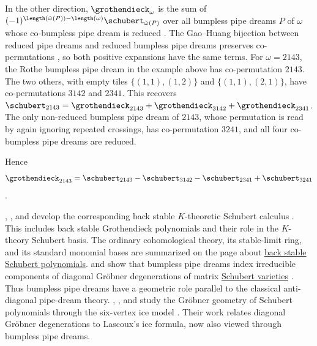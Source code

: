 In the other direction, $\grothendieck_\omega$ is the sum of
$(-1)^{\length(\check{\omega}(P)) - \length(\omega)}
\schubert_{\check{\omega}(P)}$ over all bumpless pipe dreams $P$ of $\omega$
whose co-bumpless pipe dream is reduced \cite[Thm.~1.1]{Weigandt2025x}.
The Gao--Huang bijection between reduced pipe dreams and reduced bumpless pipe
dreams \cite{GaoHuang2023PipeDreams} preserves co-permutations
\cite[Thm.~1.9]{Weigandt2025x}, so both
positive expansions have the same terms.
For $\omega = 2143$, the Rothe bumpless pipe dream in the example above has
co-permutation $2143$.  The two others, with empty tiles $\{(1,1),(1,2)\}$ and
$\{(1,1),(2,1)\}$, have co-permutations $3142$ and $2341$.  This recovers
$\schubert_{2143} = \grothendieck_{2143} + \grothendieck_{3142} + \grothendieck_{2341}$.
The only non-reduced bumpless pipe dream of $2143$, whose permutation is read
by again ignoring repeated crossings, has co-permutation $3241$,
and all four co-bumpless pipe dreams are reduced.

  Hence
\[
  \grothendieck_{2143} = \schubert_{2143} - \schubert_{3142}
  - \schubert_{2341} + \schubert_{3241}
\]
\cite[Ex.~1.4]{Weigandt2025x}.

, , and  develop
the corresponding back stable $K$-theoretic Schubert calculus
\cite{LamLeeShimozono2022}.  This includes back stable Grothendieck
polynomials and their role in the $K$-theory Schubert basis.
The ordinary cohomological theory, its stable-limit ring, and its standard
monomial bases are summarized on the page about
\hyperref[backStableSchubert]{back stable Schubert polynomials}.
 and  show that bumpless pipe dreams
index irreducible components of diagonal Gr{\"o}bner degenerations of matrix
\hyperref[schubertVarietiesAndMatroids]{Schubert varieties}
\cite{KleinWeigandt2021x}.  Thus bumpless pipe dreams have a geometric role
parallel to the classical anti-diagonal pipe-dream theory.
, , and  study
the Gr{\"o}bner geometry of Schubert polynomials through the six-vertex ice model
\cite{HamakerPechenikWeigandt2022}.  Their work relates diagonal Gr{\"o}bner
degenerations to Lascoux's ice formula, now also viewed through bumpless pipe
dreams.

